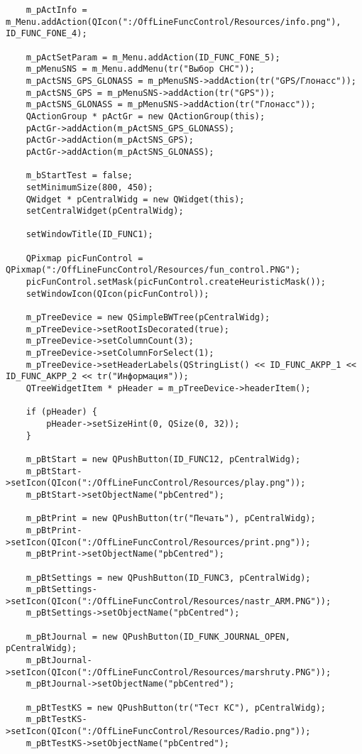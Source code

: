 \begin{verbatim}
	m_pActInfo = m_Menu.addAction(QIcon(":/OffLineFuncControl/Resources/info.png"), ID_FUNC_FONE_4);

	m_pActSetParam = m_Menu.addAction(ID_FUNC_FONE_5);
	m_pMenuSNS = m_Menu.addMenu(tr("Выбор СНС"));
	m_pActSNS_GPS_GLONASS = m_pMenuSNS->addAction(tr("GPS/Глонасс"));
	m_pActSNS_GPS = m_pMenuSNS->addAction(tr("GPS"));
	m_pActSNS_GLONASS = m_pMenuSNS->addAction(tr("Глонасс"));
	QActionGroup * pActGr = new QActionGroup(this);
	pActGr->addAction(m_pActSNS_GPS_GLONASS);
	pActGr->addAction(m_pActSNS_GPS);
	pActGr->addAction(m_pActSNS_GLONASS);

	m_bStartTest = false;
	setMinimumSize(800, 450);
	QWidget * pCentralWidg = new QWidget(this);
	setCentralWidget(pCentralWidg);

	setWindowTitle(ID_FUNC1);

	QPixmap picFunControl = QPixmap(":/OffLineFuncControl/Resources/fun_control.PNG");
	picFunControl.setMask(picFunControl.createHeuristicMask());
	setWindowIcon(QIcon(picFunControl));

	m_pTreeDevice = new QSimpleBWTree(pCentralWidg);
	m_pTreeDevice->setRootIsDecorated(true);
	m_pTreeDevice->setColumnCount(3);
	m_pTreeDevice->setColumnForSelect(1);
	m_pTreeDevice->setHeaderLabels(QStringList() << ID_FUNC_AKPP_1 << ID_FUNC_AKPP_2 << tr("Информация"));
	QTreeWidgetItem * pHeader = m_pTreeDevice->headerItem();

	if (pHeader) {
		pHeader->setSizeHint(0, QSize(0, 32));
	}

	m_pBtStart = new QPushButton(ID_FUNC12, pCentralWidg);
	m_pBtStart->setIcon(QIcon(":/OffLineFuncControl/Resources/play.png"));
	m_pBtStart->setObjectName("pbCentred");

	m_pBtPrint = new QPushButton(tr("Печать"), pCentralWidg);
	m_pBtPrint->setIcon(QIcon(":/OffLineFuncControl/Resources/print.png"));
	m_pBtPrint->setObjectName("pbCentred");

	m_pBtSettings = new QPushButton(ID_FUNC3, pCentralWidg);
	m_pBtSettings->setIcon(QIcon(":/OffLineFuncControl/Resources/nastr_ARM.PNG"));
	m_pBtSettings->setObjectName("pbCentred");

	m_pBtJournal = new QPushButton(ID_FUNK_JOURNAL_OPEN, pCentralWidg);
	m_pBtJournal->setIcon(QIcon(":/OffLineFuncControl/Resources/marshruty.PNG"));
	m_pBtJournal->setObjectName("pbCentred");

	m_pBtTestKS = new QPushButton(tr("Тест КС"), pCentralWidg);
	m_pBtTestKS->setIcon(QIcon(":/OffLineFuncControl/Resources/Radio.png"));
	m_pBtTestKS->setObjectName("pbCentred");


\end{verbatim}
